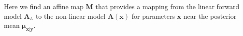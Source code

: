 \documentclass{article}
\begin{document}
Here we find an affine map $\bm{M}$ that provides a mapping from the linear forward model $\bm{A}_L$ to the non-linear model $\bm{A}(\bm{x})$ for parameters $\bm{x}$ near the posterior mean $\bm{\mu}_{\bm{x}|\bm{y}}$.
%		
%		
%		
%		
\end{document}
